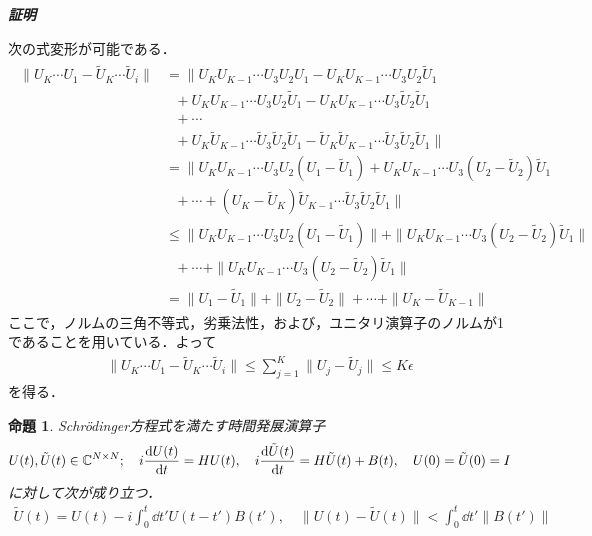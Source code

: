 \documentclass[dvipdfmx]{jarticle}
\makeatletter
\numberwithin{equation}{section}
\renewenvironment{proof}[1][\proofname]{\par
  \pushQED{\qed}
  \normalfont \topsep6\p@\@plus6\p@\relax
  \trivlist
  \item\relax
  {\itshape
  #1\@addpunct{ }}\hspace\labelsep\ignorespaces
}{
  \popQED\endtrivlist\@endpefalse
}
\theoremstyle{seminar}
\newtheorem{proposition}{命題}[section]
\renewcommand{\proofname}{\textbf{証明}}
\makeatother
\begin{document}
\begin{proof}
  次の式変形が可能である．
  \begin{align}
    \begin{split}
      \|U_K \cdots U_1 - \tilde{U}_K \cdots \tilde{U}_i\|
      &= \| U_K U_{K-1} \cdots U_3U_2U_1 - U_KU_{K-1} \cdots U_3U_2\tilde{U}_1 \\
      &\,\,\,\,+ U_K U_{K-1} \cdots U_3U_2\tilde{U}_1 - U_KU_{K-1} \cdots U_3\tilde{U}_2\tilde{U}_1 \\
      &\,\,\,\,+ \cdots \\
      &\,\,\,\,+ U_K \tilde{U}_{K-1} \cdots \tilde{U}_3 \tilde{U}_2 \tilde{U}_1 - \tilde{U}_K \tilde{U}_{K-1} \cdots \tilde{U}_3 \tilde{U}_2 \tilde{U}_1 \| \\
      &= \| U_K U_{K-1} \cdots U_3 U_2 (U_1 - \tilde{U}_1) + U_K U_{K-1} \cdots U_3 (U_2 - \tilde{U}_2) \tilde{U}_1 \\ &\,\,\,\,+  \cdots + (U_K - \tilde{U}_{K})\tilde{U}_{K-1} \cdots \tilde{U}_3 \tilde{U}_2 \tilde{U}_1 \| \\
      &\leq \| U_K U_{K-1} \cdots U_3 U_2 (U_1 - \tilde{U}_1) \| + \| U_K U_{K-1} \cdots U_3 (U_2 - \tilde{U}_2) \tilde{U}_1 \| \\
      &\,\,\,\,+ \cdots + \| U_K U_{K-1} \cdots U_3 (U_2 - \tilde{U}_2) \tilde{U}_1 \| \\
      &= \| U_1 - \tilde{U}_1 \| + \| U_2 - \tilde{U}_2 \| + \cdots + \| U_K - \tilde{U}_{K-1} \| 
    \end{split}
  \end{align}
  ここで，ノルムの三角不等式，劣乗法性，および，ユニタリ演算子のノルムが1であることを用いている．よって
  \begin{align}
    \|U_K \cdots U_1 - \tilde{U}_K \cdots \tilde{U}_i\| \leq \sum_{j = 1}^{K} \| U_j - \tilde{U}_j \| \leq K\epsilon
  \end{align}
  を得る．
\end{proof}

\begin{proposition}
  Schrödinger方程式を満たす時間発展演算子
  \begin{align}
    U(t), \tilde{U}(t) \in \mathbb{C}^{N \times N}; \quad i\dv{U(t)}{t} = HU(t), \quad i\dv{\tilde{U}(t)}{t} = H\tilde{U}(t) + B(t), \quad U(0) = \tilde{U}(0) = I
  \end{align}
  に対して次が成り立つ．
  \begin{align}
    \tilde{U}(t) = U(t) - i \int_0^t \dd t' U(t - t')B(t'), \quad \| U(t) - \tilde{U}(t) \| < \int_0^t \dd t' \| B(t')\| \label{solution}
  \end{align}
\end{proposition}
\end{document}
